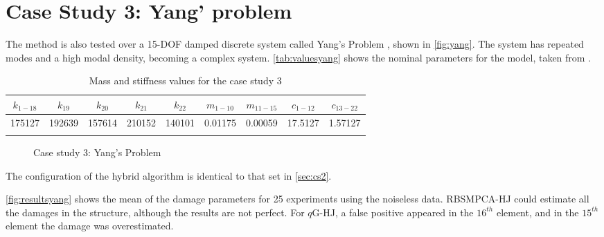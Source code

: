 \section{Case Study 3: Yang' problem}

The method is also tested over a 15-DOF damped discrete system called Yang's Problem , shown in \autoref{fig:yang}. The system has repeated modes and a high modal density, becoming a complex system. \autoref{tab:valuesyang} shows the nominal parameters for the model, taken from .

\begin{table}[H]
    \caption{Mass and stiffness values for the case study 3}
    \label{tab:valuesyang}
    \footnotesize
    \centering
    \begin{tabular}{ccccccccc}
        \hline
         $k_{1-18}$ & $k_{19}$ & $k_{20}$ & $k_{21}$ & $k_{22}$ & $m_{1-10}$ & $m_{11-15}$ & $c_{1-12}$ & $c_{13-22}$  \\
        \hline
        175127 & 192639 & 157614 & 210152 & 140101 & 0.01175 & 0.00059 & 17.5127 & 1.57127 \\
        \hline
        \\
    \end{tabular}
\end{table}

\begin{figure}[H]
\caption{Case study 3: Yang's Problem}
\label{fig:yang}
\centering
{}
\end{figure}

The configuration of the hybrid algorithm is identical to that set in \autoref{sec:cs2}.

\autoref{fig:resultsyang} shows the mean of the damage parameters for 25 experiments using the noiseless data. RBSMPCA-HJ could estimate all the damages in the structure, although the results are not perfect. For $q$G-HJ, a false positive appeared in the $16^{th}$ element, and in the $15^{th}$ element the damage was overestimated.

\datatable
    \pgfplotstabletranspose[colnames from=element]\dataset{\datatable}

